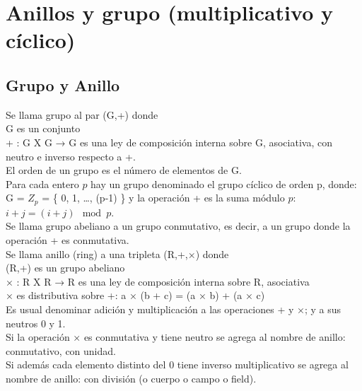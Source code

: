 \chapter{Anillos y grupo (multiplicativo y cíclico)}
\label{anexo:iso}

\section{Grupo y Anillo}
Se llama grupo al par (G,+) donde \\
G es un conjunto \\
+ : G X G → G \quad es una ley de composición interna sobre G, asociativa, con neutro e inverso respecto a +. \\
El orden de un grupo es el número de elementos de G. \\
Para cada entero $p$ hay un grupo denominado el grupo cíclico de orden p, donde: \\
G = $Z_p$ = \{ 0, 1, …, (p-1) \} y la operación + es la suma módulo $p$: $i + j = (i + j) \mod p$. \\
Se llama grupo abeliano a un grupo conmutativo, es decir, a un grupo donde la operación + es conmutativa. \\

Se llama anillo (ring) a una tripleta (R,+,×) donde \\
(R,+) \quad es un grupo abeliano \\
× : R X R → R \quad es una ley de composición interna sobre R, asociativa \\
× es distributiva sobre +:	a × (b + c) = (a × b) + (a × c) \\
Es usual denominar adición y multiplicación a las operaciones + y ×; y a sus neutros 0 y 1. \\

Si la operación × es conmutativa y tiene neutro se agrega al nombre de anillo: conmutativo, con unidad. \\
Si además cada elemento distinto del 0 tiene inverso multiplicativo se agrega al nombre de anillo: con división (o cuerpo o campo o field).

